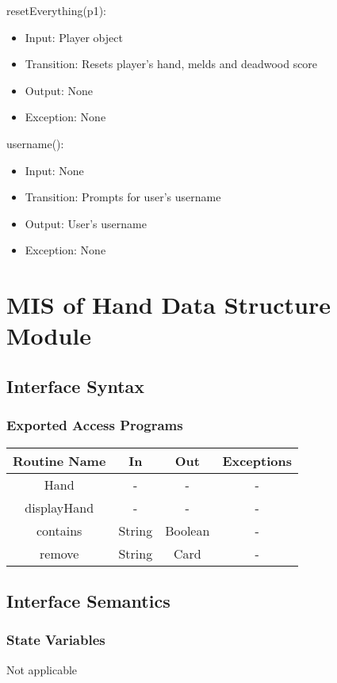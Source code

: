\documentclass[12pt, titlepage]{article}
\begin{document}
\noindent resetEverything(p1):
\begin{itemize}
    \item Input: Player object
    \item Transition: Resets player's hand, melds and deadwood score
    \item Output: None
    \item Exception: None
\end{itemize}

\noindent username():
\begin{itemize}
    \item Input: None
    \item Transition: Prompts for user's username
    \item Output: User's username
    \item Exception: None
\end{itemize}

\section{MIS of Hand Data Structure Module}

\subsection{Interface Syntax}
\subsubsection{Exported Access Programs}
\begin{tabular}[pos]{| c | c | c | c |}
    \hline
    \textbf{Routine Name} & \textbf{In} & \textbf{Out} & \textbf{Exceptions}\\
    \hline
    Hand & - & - & -\\
    \hline
    displayHand & - & - & -\\
    \hline
    contains & String & Boolean & -\\
    \hline
    remove & String & Card & - \\
    \hline
\end{tabular}

\subsection{Interface Semantics}
\subsubsection{State Variables}
Not applicable
\end{document}

